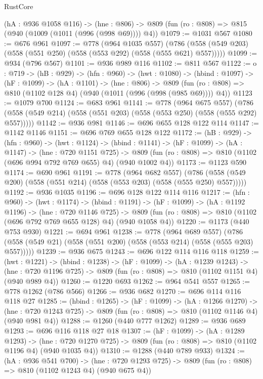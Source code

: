 \begin{lexlean}{RustCore}
\begin{coremodule}
  (hA : @936 @1058 @116) ->
  (hne : @806) -> @809 (fun (ro : @808) => @815 (@940 (@1009 (@1011 (@996 (@998 @69)))) @4))
@1079 := @1031 @567
@1080 := @676 @961
@1097 := @778
    (@964 @1035 @557)
    (@786 (@558 (@549 @203) (@558 (@551 @250) (@558 (@553 @292) (@558 (@555 @621) @557)))))
@1099 := @934 (@796 @567)
@1101 := @936 @989 @116
@1102 := @811 @567
@1122 := {o : @719} ->
  (hB : @929) ->
  (hfn : @960) ->
  (hwt : @1080) ->
  (hbind : @1097) ->
  (hF : @1099) ->
  (hA : @1101) ->
  (hne : @806) ->
  @809 (fun (ro : @808) => @810 (@1102 @128 @4) (@940 (@1011 (@996 (@998 (@985 @69)))) @4))
@1123 := @1079 @700
@1124 := @683 @961
@1141 := @778
    (@964 @675 @557)
    (@786 (@558 (@549 @214) (@558 (@551 @203) (@558 (@553 @250) (@558 (@555 @292) @557)))))
@1142 := @936 @981
@1146 := @696 @655 @128 @122 @114
@1147 := @1142 @1146
@1151 := @696 @769 @655 @128 @122
@1172 := (hB : @929) ->
  (hfn : @960) ->
  (hwt : @1124) ->
  (hbind : @1141) ->
  (hF : @1099) ->
  (hA : @1147) ->
  (hne : @720 @1151 @725) ->
  @809 (fun (ro : @808) => @810 (@1102 (@696 @994 @792 @769 @655) @4) (@940 @1002 @4))
@1173 := @1123 @590
@1174 := @690 @961
@1191 := @778
    (@964 @682 @557)
    (@786 (@558 (@549 @200) (@558 (@551 @214) (@558 (@553 @203) (@558 (@555 @250) @557)))))
@1192 := @936 @1035
@1196 := @696 @128 @122 @114 @116
@1217 := (hfn : @960) ->
  (hwt : @1174) ->
  (hbind : @1191) ->
  (hF : @1099) ->
  (hA : @1192 @1196) ->
  (hne : @720 @1146 @725) ->
  @809 (fun (ro : @808) => @810 (@1102 (@696 @792 @769 @655 @128) @4) (@940 @1058 @4))
@1220 := @1173 (@440 @753 @930)
@1221 := @694 @961
@1238 := @778
    (@964 @689 @557)
    (@786 (@558 (@549 @21) (@558 (@551 @200) (@558 (@553 @214) (@558 (@555 @203) @557)))))
@1239 := @936 @675
@1243 := @696 @122 @114 @116 @118
@1259 := (hwt : @1221) ->
  (hbind : @1238) ->
  (hF : @1099) ->
  (hA : @1239 @1243) ->
  (hne : @720 @1196 @725) -> @809 (fun (ro : @808) => @810 (@1102 @1151 @4) (@940 @989 @4))
@1260 := @1220 @693
@1262 := @964 @541 @557
@1265 := @778 @1262 (@786 @566)
@1266 := @936 @682
@1270 := @696 @114 @116 @118 @27
@1285 := (hbind : @1265) ->
  (hF : @1099) ->
  (hA : @1266 @1270) ->
  (hne : @720 @1243 @725) -> @809 (fun (ro : @808) => @810 (@1102 @1146 @4) (@940 @981 @4))
@1288 := @1260 (@440 @777 @1262)
@1289 := @936 @689
@1293 := @696 @116 @118 @27 @18
@1307 := (hF : @1099) ->
  (hA : @1289 @1293) ->
  (hne : @720 @1270 @725) -> @809 (fun (ro : @808) => @810 (@1102 @1196 @4) (@940 @1035 @4))
@1310 := @1288 (@440 @789 @933)
@1324 := (hA : @936 @541 @700) ->
  (hne : @720 @1293 @725) -> @809 (fun (ro : @808) => @810 (@1102 @1243 @4) (@940 @675 @4))

\end{coremodule}
\end{lexlean}
